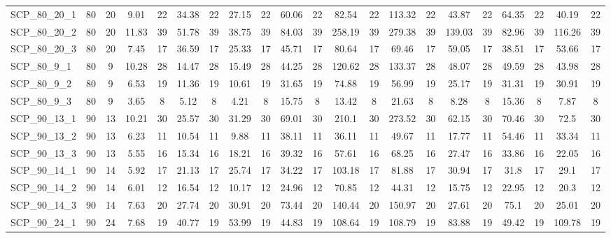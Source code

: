 \begin{sidewaystable}[!ht]
{\begin{tabular}{lcccccccccccccccccccc}
SCP\_80\_20\_1 & 80 & 20 &  \textcolor{blue2}{9.01} & 22 & 34.38 & 22 & 27.15 & 22 & 60.06 & 22 & 82.54 & 22 & 113.32 & 22 & 43.87 & 22 & 64.35 & 22 & 40.19 & 22 \\
SCP\_80\_20\_2 & 80 & 20 &  \textcolor{blue2}{11.83} & 39 & 51.78 & 39 & 38.75 & 39 & 84.03 & 39 & 258.19 & 39 & 279.38 & 39 & 139.03 & 39 & 82.96 & 39 & 116.26 & 39 \\
SCP\_80\_20\_3 & 80 & 20 &  \textcolor{blue2}{7.45} & 17 & 36.59 & 17 & 25.33 & 17 & 45.71 & 17 & 80.64 & 17 & 69.46 & 17 & 59.05 & 17 & 38.51 & 17 & 53.66 & 17 \\
SCP\_80\_9\_1 & 80 & 9 &  \textcolor{blue2}{10.28} & 28 & 14.47 & 28 & 15.49 & 28 & 44.25 & 28 & 120.62 & 28 & 133.37 & 28 & 48.07 & 28 & 49.59 & 28 & 43.98 & 28 \\
SCP\_80\_9\_2 & 80 & 9 &  \textcolor{blue2}{6.53} & 19 & 11.36 & 19 & 10.61 & 19 & 31.65 & 19 & 74.88 & 19 & 56.99 & 19 & 25.17 & 19 & 31.31 & 19 & 30.91 & 19 \\
SCP\_80\_9\_3 & 80 & 9 &  \textcolor{blue2}{3.65} & 8 & 5.12 & 8 & 4.21 & 8 & 15.75 & 8 & 13.42 & 8 & 21.63 & 8 & 8.28 & 8 & 15.36 & 8 & 7.87 & 8 \\
SCP\_90\_13\_1 & 90 & 13 &  \textcolor{blue2}{10.21} & 30 & 25.57 & 30 & 31.29 & 30 & 69.01 & 30 & 210.1 & 30 & 273.52 & 30 & 62.15 & 30 & 70.46 & 30 & 72.5 & 30 \\
SCP\_90\_13\_2 & 90 & 13 &  \textcolor{blue2}{6.23} & 11 & 10.54 & 11 & 9.88 & 11 & 38.11 & 11 & 36.11 & 11 & 49.67 & 11 & 17.77 & 11 & 54.46 & 11 & 33.34 & 11 \\
SCP\_90\_13\_3 & 90 & 13 &  \textcolor{blue2}{5.55} & 16 & 15.34 & 16 & 18.21 & 16 & 39.32 & 16 & 57.61 & 16 & 68.25 & 16 & 27.47 & 16 & 33.86 & 16 & 22.05 & 16 \\
SCP\_90\_14\_1 & 90 & 14 &  \textcolor{blue2}{5.92} & 17 & 21.13 & 17 & 25.74 & 17 & 34.22 & 17 & 103.18 & 17 & 81.88 & 17 & 30.94 & 17 & 31.8 & 17 & 29.1 & 17 \\
SCP\_90\_14\_2 & 90 & 14 &  \textcolor{blue2}{6.01} & 12 & 16.54 & 12 & 10.17 & 12 & 24.96 & 12 & 70.85 & 12 & 44.31 & 12 & 15.75 & 12 & 22.95 & 12 & 20.3 & 12 \\
SCP\_90\_14\_3 & 90 & 14 &  \textcolor{blue2}{7.63} & 20 & 27.74 & 20 & 30.91 & 20 & 73.44 & 20 & 140.44 & 20 & 150.97 & 20 & 27.61 & 20 & 75.1 & 20 & 25.01 & 20 \\
SCP\_90\_24\_1 & 90 & 24 &  \textcolor{blue2}{7.68} & 19 & 40.77 & 19 & 53.99 & 19 & 44.83 & 19 & 108.64 & 19 & 108.79 & 19 & 83.88 & 19 & 49.42 & 19 & 109.78 & 19 \\

\end{tabular}}
\end{sidewaystable}
